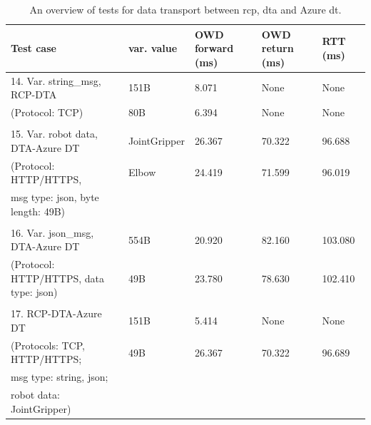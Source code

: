 \begin{table}[htbp]
    \footnotesize
\centering
\caption{An overview of tests for data transport between \gls{rcp}, \gls{dta} and Azure \gls{dt}.}
\label{tab: TestsDT}

\begin{tabular}{m{} m{} m{} m{} m{}}
\textbf{Test case}                               & \textbf{var. value}   & \textbf{OWD forward (ms)} & \textbf{OWD return (ms)} & \textbf{RTT (ms)} \\ \hline
14. Var. string\_msg, RCP-DTA           & 151B         & 8.071  & None   & None    \\
(Protocol: TCP)                         & 80B          & 6.394  & None   & None    \\
                                        &              &        &        &         \\
15. Var. robot data, DTA-Azure DT       & JointGripper & 26.367 & 70.322 & 96.688  \\
(Protocol: HTTP/HTTPS,                  & Elbow        & 24.419 & 71.599 & 96.019  \\
msg type: json, byte length: 49B)       &              &        &        &         \\
                                        &              &        &        &         \\
16. Var. json\_msg, DTA-Azure DT        & 554B         & 20.920 & 82.160 & 103.080 \\
(Protocol: HTTP/HTTPS, data type: json) & 49B          & 23.780 & 78.630 & 102.410 \\
                                        &              &        &        &         \\
17. RCP-DTA-Azure DT                    & 151B         & 5.414  & None   & None    \\
(Protocols: TCP, HTTP/HTTPS;            & 49B          & 26.367 & 70.322 & 96.689  \\
msg type: string, json;                 &              &        &        &         \\
robot data: JointGripper)               &              &        &        &    
\end{tabular}%

\end{table}



